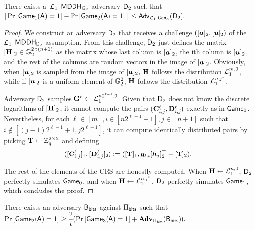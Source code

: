 \begin{lemma} There exists a\ \(\mathcal{L}_1\)-\(\mathsf{MDDH}_{\mathbb{G}_2}\) adversary \(\mathsf{D}_2\) such that
\(|\Pr\left[\allowbreak\mathsf{Game}_{1}(\advA)\allowbreak=1\right]\linebreak-\Pr\left[\mathsf{Game}_{2}(\advA)=1\right]|\) \(\leq \mathsf{Adv}_{\mathcal{L}_1,\mathsf{Gen}_a}(\mathsf{D}_2).\)
\end{lemma}
\begin{proof}
We construct an adversary \(\mathsf{D}_2\) that receives 
a challenge \(([{\boldsymbol{a}}]_2,[{\boldsymbol{u}}]_2)\) of the 
\(\mathcal{L}_1\)-\(\mathsf{MDDH}_{\mathbb{G}_2}\) assumption. From this challenge, \(\mathsf{D}_2\) just defines the matrix  \([\mathbf{{H}}]_2\in\mathbb{G}_2^{2\times(n+1)}\) as the matrix whose last column is \([{\boldsymbol{a}}]_2\), the ith column is \([{\boldsymbol{u}}]_2\), and the rest of the columns are random vectors in the image of \([{\boldsymbol{a}}]_2\). 
Obviously, when \([{\boldsymbol{u}}]_2\) is sampled from 
the image of \([{\boldsymbol{a}}]_2,\) \(\mathbf{{H}}\) follows the distribution \(\mathcal{L}_1^{m,0}\), while if \([{\boldsymbol{u}}]_2\) is a uniform element of \(\mathbb{G}^2_2\), \(\mathbf{{H}}\) follows the distribution \(\mathcal{L}_1^{n,j^*}\). 
 
Adversary \(\mathsf{D}_2\) samples
\(\mathbf{{G}}^{\ell} \gets \mathcal{L}_1^{n2^{\ell-1},0}\). Given that \(\mathsf{D}_2\) does not know the discrete logarithms of \([\mathbf{{H}}]_2\), it cannot compute the pairs \((\mathbf{{C}}^\ell_{i,j},\mathbf{{D}}^\ell_{i,j})\) exactly as in \(\mathsf{Game}_0\). Nevertheless, for each \(\ell\in[m],i\in[n2^{\ell-1}+1],j\in[n+1]\) such that $i\notin[(j-1)2^{\ell-1}+1,j2^{\ell-1}]$, it can compute identically distributed pairs by picking \(\mathbf{{T}}\gets\mathbb{Z}_q^{2\times 2}\) and defining
\[
([\mathbf{{C}}^\ell_{i,j}]_1,[\mathbf{{D}}^\ell_{i,j}]_2):=([\mathbf{{T}}]_1,{\boldsymbol{g}}_{\ell,i}[{\boldsymbol{h}}_j]_2^\top-[\mathbf{{T}}]_2).
\]

The rest of the elements of the CRS are honestly computed. When \(\mathbf{{H}}\gets\mathcal{L}_1^{n,0}\), \(\mathsf{D}_2\) perfectly simulates \(\mathsf{Game}_0\), and when \(\mathbf{{H}}\gets\mathcal{L}_1^{n,j^*}\), \(\mathsf{D}_2\) perfectly simulates \(\mathsf{Game}_1\), which concludes the proof. 
\end{proof}

\begin{lemma} There exists an adversary \(\mathsf{B}_{\mathsf{bits}}\) against \(\Pi_{\mathsf{bits}}\) such that
\(\Pr\left[\allowbreak \mathsf{Game}_2(\mathsf{A})\allowbreak =1\right]\geq\dfrac{2}{t }(\Pr\left[\mathsf{Game}_3(\mathsf{A})=1\right]+\mathbf{Adv}_{\Pi_{\mathsf{bits}}}(\mathsf{B}_{\mathsf{bits}})).\)
\end{lemma}

